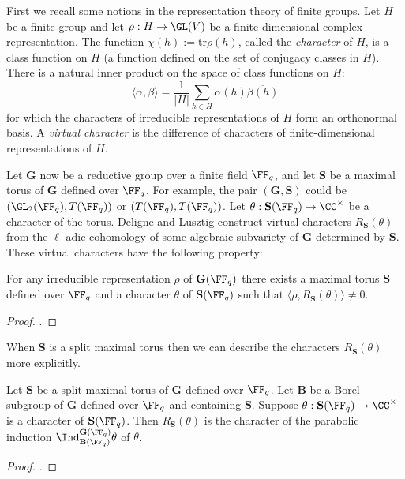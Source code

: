 First we recall some notions in the representation theory of finite groups. Let $H$ be a finite group and let $\rho:H \to \GL(V)$ be a finite-dimensional complex representation. The function $\chi(h):=\mathrm{tr}\rho(h)$, called the \textit{character} of $H$, is a class function on $H$ (a function defined on the set of conjugacy classes in $H$). There is a natural inner product on the space of class functions on $H$:
$$\langle \alpha, \beta \rangle = \frac{1}{|H|} \sum\limits_{h \in H}\alpha(h)\overline{\beta(h)}$$ for which the characters of irreducible representations of $H$ form an orthonormal basis. A \textit{virtual character} is the difference of characters of finite-dimensional representations of $H$.

Let $\mathbf G$ now be a reductive group over a finite field $\FF_q$, and let $\mathbf S$ be a maximal torus of $\mathbf G$ defined over $\FF_q$. For example, the pair $(\mathbf G,\mathbf S)$ could be $(\GL_2(\FF_q),T(\FF_q))$ or $(T(\FF_q),T(\FF_q))$. Let $\theta: \mathbf S(\FF_q) \to \CC^\times$ be a character of the torus. Deligne and Lusztig construct virtual characters $R_{\mathbf S}(\theta)$ from the $\ell$-adic cohomology of some algebraic subvariety of $\mathbf G$ determined by $\mathbf S$. These virtual characters have the following property:

\begin{thm}
    For any irreducible representation $\rho$ of $\mathbf G(\FF_q)$ there exists a maximal torus $\mathbf S$ defined over $\FF_q$ and a character $\theta$ of $\mathbf S(\FF_q)$ such that $\langle \rho, R_{\mathbf S}(\theta)\rangle \neq 0$.
\end{thm}
\begin{proof}
    \cite[Corollary 7.7]{DL1}.
\end{proof}

When $\mathbf S$ is a split maximal torus then we can describe the characters $R_{\mathbf S}(\theta)$ more explicitly.

\begin{prop}\label{prop:DLinduct}
    Let $\mathbf S$ be a split maximal torus of $\mathbf G$ defined over $\FF_q$. Let $\mathbf B$ be a Borel subgroup of $\mathbf G$ defined over $\FF_q$ and containing $\mathbf S$. Suppose $\theta: \mathbf S(\FF_q) \to \CC^\times$ is a character of $\mathbf S(\FF_q)$. Then $R_{\mathbf S}(\theta)$ is the character of the parabolic induction $\Ind_{\mathbf B(\FF_q)}^{\mathbf G(\FF_q)} \theta$ of $\theta$.
\end{prop}
\begin{proof}
    \cite[Proposition 7.2.4]{Car1}.
\end{proof}

